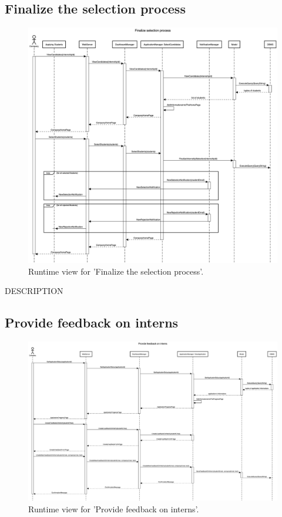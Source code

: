\subsection{Finalize the selection process}
\begin{figure}[H]
    \begin{center}
        \includegraphics[width=0.8\linewidth]{DD/LaTeX/Images/RuntimeView/FinalizeSelectionProcess.png}
        \caption{Runtime view for 'Finalize the selection process'.}
        \label{fig:runtime_FinalizeSelectionProcess}%
    \end{center}
\end{figure}

DESCRIPTION


\subsection{Provide feedback on interns}
\begin{figure}[H]
    \begin{center}
        \includegraphics[width=0.8\linewidth]{DD/LaTeX/Images/RuntimeView/ProvideFeedbackOnIntern.png}
        \caption{Runtime view for 'Provide feedback on interns'.}
        \label{fig:runtime_ProvideFeedbackOnIntern}%
    \end{center}
\end{figure}

